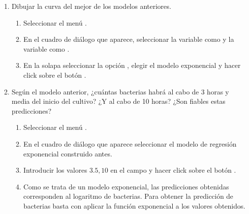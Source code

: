 \begin{enumerate}[leftmargin=*]
\begin{enumerate}
\item Dibujar la curva del mejor de los modelos anteriores.
\begin{indicacion}{
\begin{enumerate}
\item Seleccionar el menú .
\item En el cuadro de diálogo que aparece, seleccionar la variable  como 
y la variable  como .
\item En la solapa  seleccionar la opción , elegir el
modelo exponencial y hacer click sobre el botón .
\end{enumerate}}
\end{indicacion}

\item Según el modelo anterior, ¿cuántas bacterias habrá al cabo de 3 horas y media del inicio del cultivo? 
¿Y al cabo de 10 horas? 
¿Son fiables estas predicciones?
\begin{indicacion}{
\begin{enumerate}
\item Seleccionar el menú .
\item En el cuadro de diálogo que aparece seleccionar el modelo de regresión exponencial construido antes.
\item Introducir los valores $3.5, 10$ en el campo  y hacer click sobre el botón .
\item Como se trata de un modelo exponencial, las predicciones obtenidas corresponden al logaritmo de bacterias. 
Para obtener la predicción de bacterias basta con aplicar la función exponencial a los valores obtenidos.
\end{enumerate}}
\end{indicacion}


\end{enumerate}
\end{enumerate}
